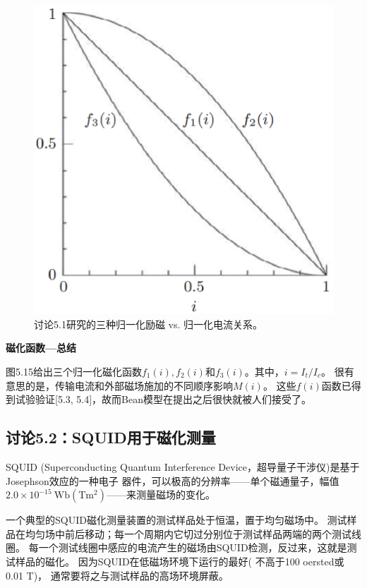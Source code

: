 \begin{figure}[htbp]
	\centering
	\includegraphics[scale=0.5]{chpt5/figs/fig5.15.eps}
	\caption{讨论5.1研究的三种归一化励磁 vs. 归一化电流关系。}
\end{figure}

\textbf{磁化函数---总结}

图5.15给出三个归一化磁化函数$f_1(i), f_2(i)$和$f_3(i)$。其中，$i = I_t/I_c$。
很有意思的是，传输电流和外部磁场施加的不同顺序影响$M(i)$。
这些$f(i)$函数已得到试验验证[5.3, 5.4]，故而Bean模型在提出之后很快就被人们接受了。


\subsection{讨论5.2：SQUID用于磁化测量}
SQUID (Superconducting Quantum Interference Device，超导量子干涉仪)是基于Josephson效应的一种电子
器件，可以极高的分辨率——单个磁通量子，幅值$2.0\times 10^{−15}\ \mathrm{Wb(Tm^2)}$——来测量磁场的变化。

一个典型的SQUID磁化测量装置的测试样品处于恒温，置于均匀磁场中。
测试样品在均匀场中前后移动；每一个周期内它切过分别位于测试样品两端的两个测试线圈。
每一个测试线圈中感应的电流产生的磁场由SQUID检测，反过来，这就是测试样品的磁化。
因为SQUID在低磁场环境下运行的最好( 不高于100 oersted或0.01 T)，
通常要将之与测试样品的高场环境屏蔽。


